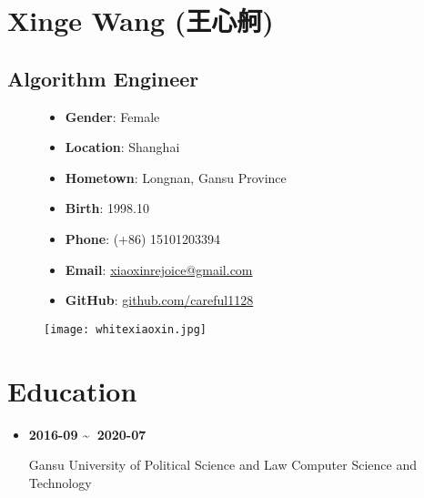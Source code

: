 \documentclass[11pt,a4paper]{article}
\begin{document}
\section*{Xinge Wang (王心舸)}
\subsection*{Algorithm Engineer}

\begin{figure}[h!]
    \begin{minipage}[c]{0.7\textwidth}  %
        \begin{itemize}[leftmargin=*,noitemsep,topsep=0pt]
            \item \textbf{Gender}: Female 
            \item \textbf{Location}: Shanghai
            \item \textbf{Hometown}: Longnan, Gansu Province  
            \item \textbf{Birth}: 1998.10
            \item \textbf{Phone}: (+86) 15101203394
            \item \textbf{Email}: \href{mailto:xiaoxinrejoice@gmail.com}{xiaoxinrejoice@gmail.com} 
            \item \textbf{GitHub}: \href{https://github.com/careful1128}{github.com/careful1128}
        \end{itemize}
    \end{minipage}%
    \hfill  %
    \begin{minipage}[c]{0.25\textwidth}  %
        \raggedleft  %
        \texttt{[image: whitexiaoxin.jpg]} 
    \end{minipage}
\end{figure}

\section*{Education}
\begin{itemize}[leftmargin=*,noitemsep,topsep=3pt]
    \item \textbf{2016-09 \textasciitilde\ 2020-07} \\
    \begin{minipage}[t]{\linewidth}
        Gansu University of Political Science and Law
        \hfill
        Computer Science and Technology
    \end{minipage}
\end{itemize}
\end{document}
